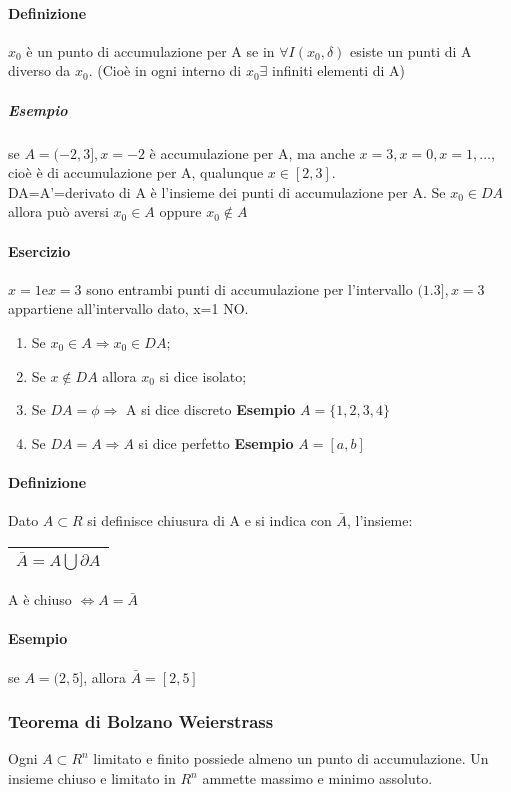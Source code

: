 \paragraph{Definizione}
$x_0$ è un punto di accumulazione per A se in $\forall I(x_0,\delta)$ esiste un
punti di A diverso da $x_0$. (Cioè in ogni interno di $x_0 \exists$ infiniti
elementi di A)

\subparagraph{Esempio} se $A=(-2,3],x=-2$ è accumulazione per A, ma anche
$x=3,x=0,x=1,\dots$, cioè è di accumulazione per A, qualunque $x\in [2,3]$.\\
DA=A'=derivato di A è l'insieme dei punti di accumulazione per A. Se $x_0\in
DA$ allora può aversi $x_0\in A$ oppure $x_0\notin A$
\paragraph{Esercizio} $x=1 \text{e} x=3$ sono entrambi punti di accumulazione
per l'intervallo $(1.3],x=3$ appartiene all'intervallo dato, x=1 NO.

\begin{enumerate}
	\item Se $x_0\in A \Rightarrow x_0\in DA$;
	\item Se $x\notin DA$ allora $x_0$ si dice isolato;
	\item Se $DA=\phi\Rightarrow$ A si dice discreto \textbf{Esempio}
		$A=\{1,2,3,4\}$
	\item Se $DA=A\Rightarrow A$ si dice perfetto \textbf{Esempio} $A=[a,b]$
\end{enumerate}
\paragraph{Definizione}
Dato $A\subset R$ si definisce chiusura di A e si indica con $\bar{A}$,
l'insieme:
\begin{tabular}{|c|}
	\hline
	$\bar{A}=A\bigcup \partial A$\\
	\hline
\end{tabular} A è chiuso $\Leftrightarrow A=\bar{A}$
\paragraph{Esempio} se $A=(2,5]$, allora $\bar{A}=[2,5]$
\subsubsection{Teorema di Bolzano Weierstrass}
Ogni $A\subset R^n$ limitato e finito possiede almeno un punto di
accumulazione. Un insieme chiuso e limitato in $R^n$ ammette massimo e minimo
assoluto.
